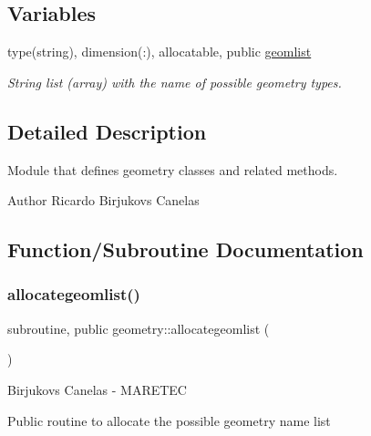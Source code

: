 \subsection*{Variables}
\begin{DoxyCompactItemize}
\item 
type(string), dimension(\+:), allocatable, public \mbox{\hyperlink{namespacegeometry_a879bd9ccab6fc42f051bbfc9f0560a62}{geomlist}}
\begin{DoxyCompactList}\small\item\em String list (array) with the name of possible geometry types. \end{DoxyCompactList}\end{DoxyCompactItemize}


\subsection{Detailed Description}
Module that defines geometry classes and related methods. 

\begin{DoxyAuthor}{Author}
Ricardo Birjukovs Canelas 
\end{DoxyAuthor}


\subsection{Function/\+Subroutine Documentation}
\mbox{\label{namespacegeometry_a17652db20fde3f883b4fc778e0e6cdda}} 
\subsubsection{\texorpdfstring{allocategeomlist()}{allocategeomlist()}}
{\footnotesize\ttfamily subroutine, public geometry\+::allocategeomlist (\begin{DoxyParamCaption}{ }\end{DoxyParamCaption})}



Birjukovs Canelas -\/ M\+A\+R\+E\+T\+EC 

Public routine to allocate the possible geometry name list \mbox{\label{namespacegeometry_ab7f40c137db819829d3110dac77a2977}} 
